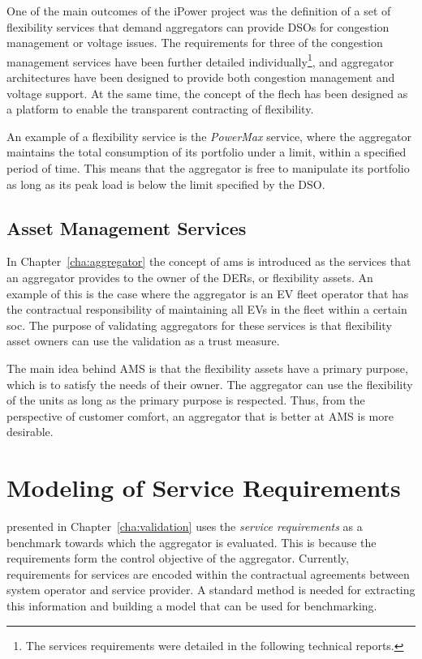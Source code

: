 One of the main outcomes of the iPower project was the definition of a set of flexibility services that demand aggregators can provide DSOs for congestion management or voltage issues. The requirements for three of the congestion management services have been further detailed individually\footnote{The services requirements were detailed in the following technical reports\cite{hansen2013flech,biegel2014flech,bondy2014flech}.}, and aggregator architectures have been designed to provide both congestion management and voltage support. At the same time, the concept of the \gls{flech} has been designed as a platform to enable the transparent contracting of flexibility.

An example of a flexibility service is the \emph{PowerMax} service, where the aggregator maintains the total consumption of its portfolio under a limit, within a specified period of time. This means that the aggregator is free to manipulate its portfolio as long as its peak load is below the limit specified by the DSO.
\subsection{Asset Management Services} %
\label{sub:assetmanagementservices}
In Chapter~\ref{cha:aggregator} the concept of \gls{ams} is introduced as the services that an aggregator provides to the owner of the DERs, or flexibility assets. An example of this is the case where the aggregator is an EV fleet operator that has the contractual responsibility of maintaining all EVs in the fleet within a certain \gls{soc}. The purpose of validating aggregators for these services is that flexibility asset owners can use the validation as a trust measure.

The main idea behind AMS is that the flexibility assets have a primary purpose, which is to satisfy the needs of their owner. The aggregator can use the flexibility of the units as long as the primary purpose is respected. Thus, from the perspective of customer comfort, an aggregator that is better at AMS is more desirable. 
\section{Modeling of Service Requirements} %
\label{sec:modelingAS}
 presented in Chapter~\ref{cha:validation} uses the \emph{service requirements} as a benchmark towards which the aggregator is evaluated. This is because the requirements form the control objective of the aggregator. Currently, requirements for services are encoded within the contractual agreements between system operator and service provider. A standard method is needed for extracting this information and building a model that can be used for benchmarking.

